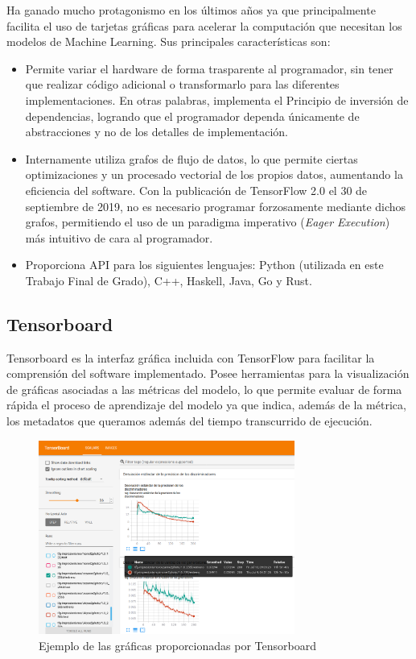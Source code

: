 \documentclass[../main.tex]{subfiles}
\begin{document}
Ha ganado mucho protagonismo en los últimos años ya que principalmente facilita el uso de tarjetas gráficas para acelerar la computación que necesitan los modelos de Machine Learning. Sus principales características son:
\begin{itemize}
    \item Permite variar el hardware de forma trasparente al programador, sin tener que realizar código adicional o transformarlo para las diferentes implementaciones. En otras palabras, implementa el Principio de inversión de dependencias, logrando que el programador dependa únicamente de abstracciones y no de los detalles de implementación.
    \item Internamente utiliza grafos de flujo de datos, lo que permite ciertas optimizaciones y un procesado vectorial de los propios datos, aumentando la eficiencia del software. Con la publicación de TensorFlow 2.0 el 30 de septiembre de 2019, no es necesario programar forzosamente mediante dichos grafos, permitiendo el uso de un paradigma imperativo (\textit{Eager Execution}) más intuitivo de cara al programador.
    \item Proporciona API para los siguientes lenguajes: Python (utilizada en este Trabajo Final de Grado), C++, Haskell, Java, Go y Rust.
\end{itemize}

\subsection{Tensorboard}
Tensorboard es la interfaz gráfica incluida con TensorFlow para facilitar la comprensión del software implementado. Posee herramientas para la visualización de gráficas asociadas a las métricas del modelo, lo que permite evaluar de forma rápida el proceso de aprendizaje del modelo ya que indica, además de la métrica, los metadatos que queramos además del tiempo transcurrido de ejecución. \newline

\begin{figure}[h!]
    \centering
    \includegraphics[width=0.75\textwidth]{imagenes/Tensorboard_graficas.png}
    \caption{Ejemplo de las gráficas proporcionadas por Tensorboard}
    \label{fig:tensorboard_descripcion_graficas}
\end{figure}
\end{document}
